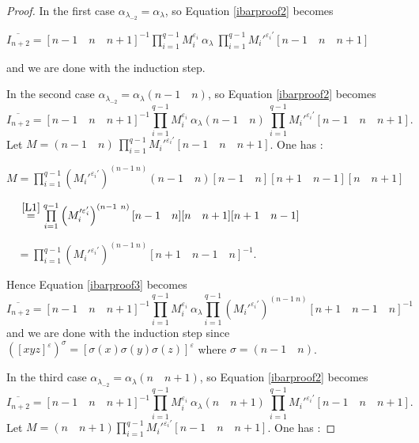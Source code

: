 \documentclass[a4paper,12pt,fleqn]{article}
\renewcommand\epsilon{\varepsilon}
\begin{document}
\begin{proof}
      In the first case $\alpha_{\lambda_{-2}}=\alpha_{\lambda}$, so Equation \eqref{ibarproof2} becomes
      
      $\overline{I_{n+2}}=[n-1\quad n\quad n+1]^{-1}\prod\limits_{i=1}^{q-1}M_i^{\varepsilon_i}\ \alpha_{\lambda}\ \prod\limits_{i=1}^{q-1}M_i'^{\varepsilon_i'}[n-1\quad n\quad n+1]$

      and we are done with the induction step.
      

      In the second case  $\alpha_{\lambda_{-2}}=\alpha_{\lambda}(n-1\quad n)$, so Equation \eqref{ibarproof2} becomes
      \begin{equation}\label{ibarproof3}
      \overline{I_{n+2}}=[n-1\quad n\quad n+1]^{-1}\prod\limits_{i=1}^{q-1}M_i^{\varepsilon_i}\ \alpha_{\lambda}(n-1\quad n)\ \prod\limits_{i=1}^{q-1}M_i'^{\varepsilon_i'}[n-1\quad n\quad n+1].
      \end{equation}
      Let $M=(n-1\quad n)\ \prod\limits_{i=1}^{q-1}M_i'^{\varepsilon_i'}[n-1\quad n\quad n+1]$. One has :

      $M=\prod\limits_{i=1}^{q-1}\left(M_i'^{\varepsilon_i'}\right)^{(n-1\ n)}(n-1\quad n)[n-1\quad n][n+1\quad n-1][n\quad n+1]$
                        
      $\phantom{M}\stackrel{\ref{L1}}{=}\prod\limits_{i=1}^{q-1}\left(M_i'^{\varepsilon_i'}\right)^{(n-1\ n)}[n-1\quad n][n\quad n+1][n+1\quad n-1]$

      $\phantom{M}=\prod\limits_{i=1}^{q-1}\left(M_i'^{\varepsilon_i'}\right)^{(n-1\  n)}[n+1\quad n-1\quad n]^{-1}$.

      Hence Equation \eqref{ibarproof3} becomes
\begin{equation*}
    \overline{I_{n+2}}=[n-1\quad n\quad n+1]^{-1}\prod\limits_{i=1}^{q-1}M_i^{\varepsilon_i}\ \alpha_{\lambda}\prod\limits_{i=1}^{q-1}\left(M_i'^{\varepsilon_i'}\right)^{(n-1\  n)}[n+1\quad n-1\quad n]^{-1}
\end{equation*}
    and we are done with the induction step since $([xyz]^{\epsilon})^{\sigma}=[\sigma(x)\sigma(y)\sigma(z)]^{\epsilon}$ where $\sigma=(n-1\quad n)$.
    

       In the third case  $\alpha_{\lambda_{-2}}=\alpha_{\lambda}(n\quad n+1)$, so Equation \eqref{ibarproof2} becomes
       \begin{equation}\label{ibarproof4}
        \overline{I_{n+2}}=[n-1\quad n\quad n+1]^{-1}\prod\limits_{i=1}^{q-1}M_i^{\varepsilon_i}\ \alpha_{\lambda}(n\quad n+1)\
        \prod\limits_{i=1}^{q-1}M_i'^{\varepsilon_i'}[n-1\quad n\quad n+1].
      \end{equation}
      Let $M=(n\quad n+1)\prod\limits_{i=1}^{q-1}M_i'^{\varepsilon_i'}[n-1\quad n\quad n+1]$. One has :
      

\end{proof}
\end{document}

